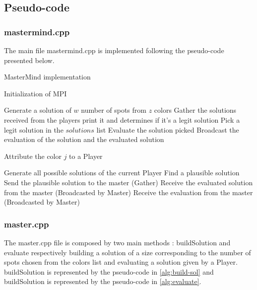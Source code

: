 \documentclass{article}
\begin{document}
\subsection{Pseudo-code}

\subsubsection{{\selectfont mastermind.cpp}}
The main file {\selectfont mastermind.cpp} is implemented following the pseudo-code presented below. 

\begin{algorithm}[H] 
  \caption{MasterMind implementation} 
  \begin{algorithmic}[1]
  \State Initialization of MPI
  
  \State Generate a solution of $w$ number of spots from $z$ colors 
  \State Gather the solutions received from the players 
  \State print it and determines if it's a legit solution
  \EndFor 
   \State Pick a legit solution in the $solutions$ list 
  \State Evaluate the solution picked 
  \State Broadcast the evaluation of the solution and the evaluated solution \\
  \EndWhile
  
  \State Attribute the color $j$ to a Player 
  \EndFor 
   
  \State Generate all possible solutions of the current Player
  \State Find a plausible solution
  \State Send the plausible solution to the master (Gather) 
  \State Receive the evaluated solution from the master (Broadcasted by Master) 
  \State Receive the evaluation from the master (Broadcasted by Master)
  \EndWhile
  
  \EndIf
  
  \EndProcedure
  \end{algorithmic}
\end{algorithm}

\subsubsection{{\selectfont master.cpp}}

The {\selectfont master.cpp} file is composed by two main methods : {\selectfont buildSolution} and {\selectfont evaluate} respectively building a solution of a size corresponding to the number of spots chosen from the colors list and evaluating a solution given by a Player. {\selectfont buildSolution} is represented by the pseudo-code in \autoref{alg:build-sol} and {\selectfont buildSolution} is represented by the pseudo-code in \autoref{alg:evaluate}. 
\end{document}
